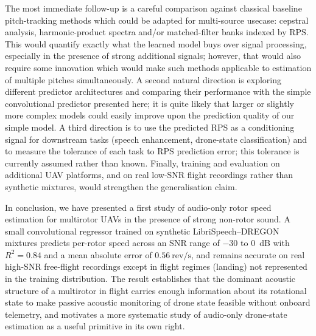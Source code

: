 \documentclass{QD_2026}
\newcommand{\revps}{\mathrm{rev}/\mathrm{s}}
\newcommand{\rsq}{R^{2}}
\begin{document}
The most immediate follow-up is a careful comparison against classical baseline pitch-tracking methods which could be adapted for multi-source usecase: cepstral analysis, harmonic-product spectra and/or matched-filter banks indexed by RPS. This would quantify exactly what the learned model buys over signal processing, especially in the presence of strong additional signals; however, that would also require some innovation which would make such methods applicable to estimation of multiple pitches simultaneously.
A second natural direction is exploring different predictor architectures and comparing their performance with the simple convolutional predictor presented here; it is quite likely that larger or slightly more complex models could easily improve upon the prediction quality of our simple model.
A third direction is to use the predicted RPS as a conditioning signal for
downstream tasks (speech enhancement, drone-state classification) and to measure
the tolerance of each task to RPS prediction error; this tolerance is currently
assumed rather than known.
Finally, training and evaluation on additional UAV platforms, and on real
low-SNR flight recordings rather than synthetic mixtures, would strengthen the
generalisation claim.

In conclusion, we have presented a first study of audio-only rotor speed estimation for multirotor UAVs in the presence of strong non-rotor sound.
A small convolutional regressor trained on synthetic LibriSpeech--DREGON mixtures
predicts per-rotor speed across an SNR range of $-30$ to $0$~dB with
$\rsq = 0.84$ and a mean absolute error of $0.56~\revps$, and remains accurate
on real high-SNR free-flight recordings except in flight regimes (landing) not
represented in the training distribution.
The result establishes that the dominant acoustic structure of a multirotor in
flight carries enough information about its rotational state to make passive
acoustic monitoring of drone state feasible without onboard telemetry, and
motivates a more systematic study of audio-only drone-state estimation as a
useful primitive in its own right.




\end{document}
